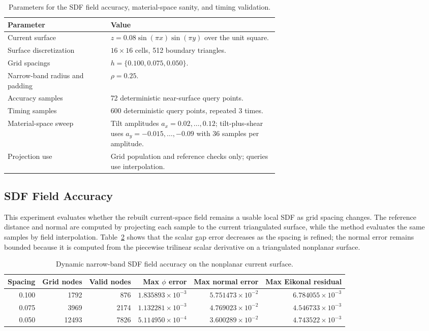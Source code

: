 \documentclass[11pt]{article}
\begin{document}
\begin{table}[t]
\centering
\small
\caption{Parameters for the SDF field accuracy, material-space sanity, and timing validation.}
\label{tab:sdf-validation-parameters}
\begin{tabular}{lp{0.62\linewidth}}
\toprule
Parameter & Value \\
\midrule
Current surface & \(z=0.08\sin(\pi x)\sin(\pi y)\) over the unit square. \\
Surface discretization & \(16\times16\) cells, 512 boundary triangles. \\
Grid spacings & \(h=\{0.100,0.075,0.050\}\). \\
Narrow-band radius and padding & \(\rho=0.25\). \\
Accuracy samples & 72 deterministic near-surface query points. \\
Timing samples & 600 deterministic query points, repeated 3 times. \\
Material-space sweep & Tilt amplitudes \(a_x=0.02,\ldots,0.12\); tilt-plus-shear uses \(a_y=-0.015,\ldots,-0.09\) with 36 samples per amplitude. \\
Projection use & Grid population and reference checks only; queries use interpolation. \\
\bottomrule
\end{tabular}
\end{table}

\subsection{SDF Field Accuracy}

This experiment evaluates whether the rebuilt current-space field remains a usable local SDF as grid spacing changes. The reference distance and normal are computed by projecting each sample to the current triangulated surface, while the method evaluates the same samples by field interpolation. Table~\ref{tab:field-accuracy} shows that the scalar gap error decreases as the spacing is refined; the normal error remains bounded because it is computed from the piecewise trilinear scalar derivative on a triangulated nonplanar surface.

\begin{table}[t]
\centering
\small
\caption{Dynamic narrow-band SDF field accuracy on the nonplanar current surface.}
\label{tab:field-accuracy}
\begin{tabular}{rrrrrr}
\toprule
Spacing & Grid nodes & Valid nodes & Max \(\phi\) error & Max normal error & Max Eikonal residual \\
\midrule
0.100 & 1792 & 876 & \(1.835893\times10^{-3}\) & \(5.751473\times10^{-2}\) & \(6.784055\times10^{-3}\) \\
0.075 & 3969 & 2174 & \(1.132281\times10^{-3}\) & \(4.769023\times10^{-2}\) & \(4.546733\times10^{-3}\) \\
0.050 & 12493 & 7826 & \(5.114950\times10^{-4}\) & \(3.600289\times10^{-2}\) & \(4.743522\times10^{-3}\) \\
\bottomrule
\end{tabular}
\end{table}
\end{document}
